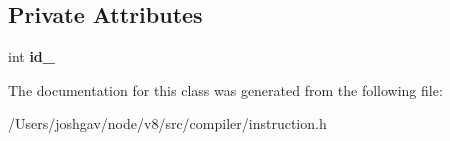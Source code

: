 \subsection*{Private Attributes}
\begin{DoxyCompactItemize}
\item 
int {\bfseries id\+\_\+}\hypertarget{classv8_1_1internal_1_1compiler_1_1_instruction_sequence_1_1_state_id_a96d10d736b031d61e239022417ac4ddf}{}\label{classv8_1_1internal_1_1compiler_1_1_instruction_sequence_1_1_state_id_a96d10d736b031d61e239022417ac4ddf}

\end{DoxyCompactItemize}


The documentation for this class was generated from the following file\+:\begin{DoxyCompactItemize}
\item 
/\+Users/joshgav/node/v8/src/compiler/instruction.\+h\end{DoxyCompactItemize}
